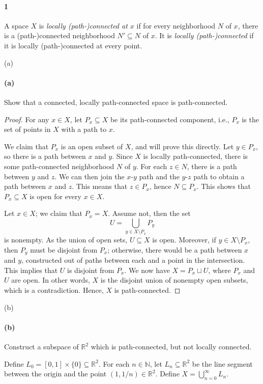 \documentclass[12pt]{article}
\newlength{\myparskip}
\newenvironment{fullbox}{\begin{lrbox}{\savefullbox}\begin{minipage}{\dimexpr\textwidth-2\fboxsep\relax}\setlength{\parskip}{\myparskip}}{\end{minipage}\end{lrbox}\framebox[\textwidth]{\usebox{\savefullbox}}}
\newenvironment{pbox}[1][]{\begin{fullbox}\ifx#1\empty\else\paragraph{#1}\fi}{\end{fullbox}}
\newcommand{\N}{\mathbb{N}}
\newcommand{\R}{\mathbb{R}}
\newcommand{\<}{\langle}
\renewcommand{\>}{\rangle}
\begin{document}
\thispagestyle{title}


\begin{pbox}[1]
    A space $X$ is \emph{locally (path-)connected at $x$} if for every neighborhood $N$ of $x$, there is a (path-)connected neighborhood $N' \subseteq N$ of $x$.  It is \emph{locally (path-)connected} if it is locally (path-)connected at every point.
\end{pbox}

\begin{pbox}[(a)]
    Show that a connected, locally path-connected space is path-connected.
\end{pbox}

\begin{proof}
    For any $x \in X$, let $P_x \subseteq X$ be its path-connected component, i.e., $P_x$ is the set of points in $X$ with a path to $x$. 
    
    We claim that $P_x$ is an open subset of $X$, and will prove this directly. Let $y \in P_x$, so there is a path between $x$ and $y$. Since $X$ is locally path-connected, there is some path-connected neighborhood $N$ of $y$. For each $z \in N$, there is a path between $y$ and $z$. We can then join the $x$-$y$ path and the $y$-$z$ path to obtain a path between $x$ and $z$. This means that $z \in P_x$, hence $N \subseteq P_x$. This shows that $P_x \subseteq X$ is open for every $x \in X$.

    Let $x \in X$; we claim that $P_x = X$. Assume not, then the set
    \[
        U = \bigcup_{y \in X \setminus P_x} P_y
    \]
    is nonempty. As the union of open sets, $U \subseteq X$ is open. Moreover, if $y \in X \setminus P_x$, then $P_y$ must be disjoint from $P_x$; otherwise, there would be a path between $x$ and $y$, constructed out of paths between each and a point in the intersection. This implies that $U$ is disjoint from $P_x$. We now have $X = P_x \sqcup U$, where $P_x$ and $U$ are open. In other words, $X$ is the disjoint union of nonempty open subsets, which is a contradiction. Hence, $X$ is path-connected.

\end{proof}

\newpage
\begin{pbox}[(b)]
    Construct a subspace of $\mathbb{R}^2$ which is path-connected, but not locally connected.
\end{pbox}

Define $L_0 = [0, 1] \times \{0\} \subseteq \R^2$. For each $n \in \N$, let $L_n \subseteq \R^2$ be the line segment between the origin and the point $(1, 1/n) \in \R^2$. Define $X = \bigcup_{n = 0}^{\infty} L_n$.
\end{document}
